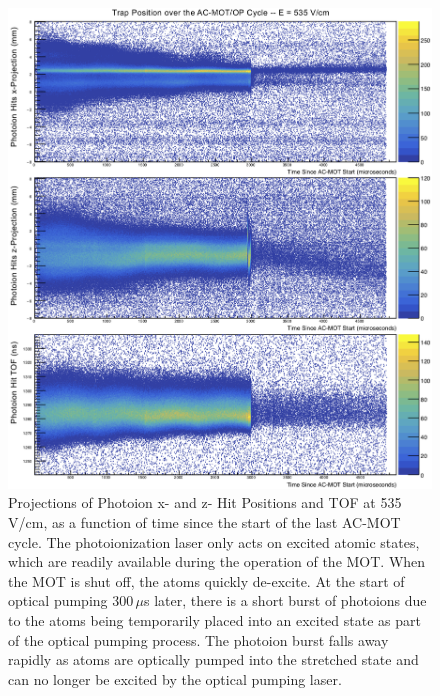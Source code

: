 \begin{figure}[h!tb]
	\centering
	\includegraphics[width=.999\linewidth]
	{Figures/rMCP_xyz_vs_acmottime.png}
	\caption[Photoion Hit Positions at 535 V/cm, as a function of AC-MOT Time]{Projections of Photoion x- and z- Hit Positions and TOF at 535 V/cm, as a function of time since the start of the last AC-MOT cycle.  The photoionization laser only acts on excited atomic states, which are readily available during the operation of the MOT.  When the MOT is shut off, the atoms quickly de-excite.  At the start of optical pumping 300$\,\mu$s later, there is a short burst of photoions due to the atoms being temporarily placed into an excited state as part of the optical pumping process.  The photoion burst falls away rapidly as atoms are optically pumped into the stretched state and can no longer be excited by the optical pumping laser.}	
	\label{fig:position_v_acmottime_3axes}
\end{figure}
\FloatBarrier %



